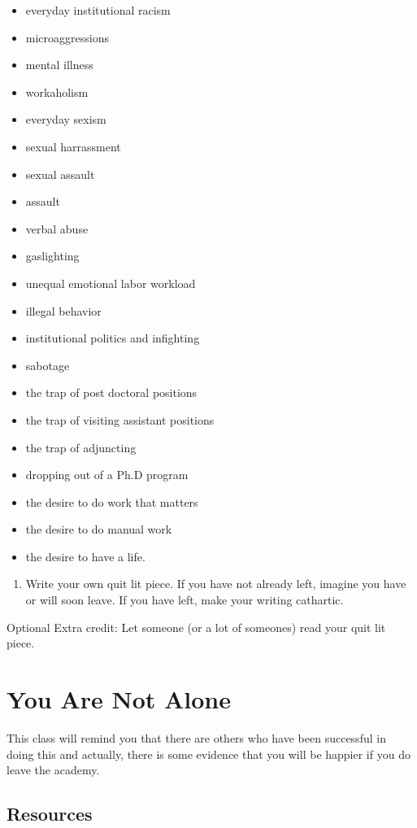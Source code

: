 \documentclass[]{book}
\providecommand{\tightlist}{%
  \setlength{\itemsep}{0pt}\setlength{\parskip}{0pt}}
\begin{document}
\begin{itemize}
\item
  everyday institutional racism
\item
  microaggressions
\item
  mental illness
\item
  workaholism
\item
  everyday sexism
\item
  sexual harrassment
\item
  sexual assault
\item
  assault
\item
  verbal abuse
\item
  gaslighting
\item
  unequal emotional labor workload
\item
  illegal behavior
\item
  institutional politics and infighting
\item
  sabotage
\item
  the trap of post doctoral positions
\item
  the trap of visiting assistant positions
\item
  the trap of adjuncting
\item
  dropping out of a Ph.D program
\item
  the desire to do work that matters
\item
  the desire to do manual work
\item
  the desire to have a life.
\end{itemize}

\begin{enumerate}
\def\labelenumi{\arabic{enumi}.}
\setcounter{enumi}{1}
\tightlist
\item
  Write your own quit lit piece. If you have not already left, imagine
  you have or will soon leave. If you have left, make your writing
  cathartic.
\end{enumerate}

Optional Extra credit: Let someone (or a lot of someones) read your quit
lit piece.

\chapter{You Are Not Alone}\label{you-are-not-alone}

This class will remind you that there are others who have been
successful in doing this and actually, there is some evidence that you
will be happier if you do leave the academy.

\section{Resources}\label{resources}
\end{document}
